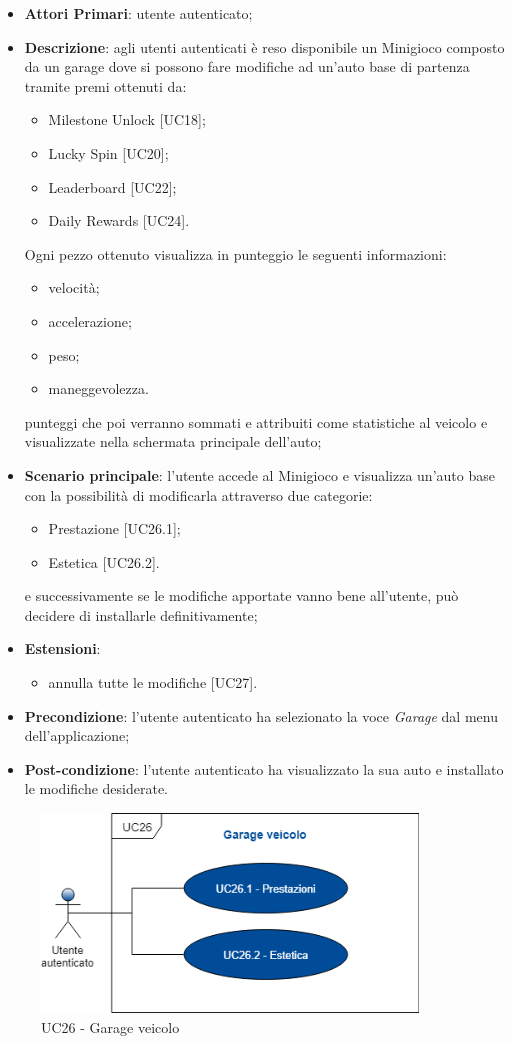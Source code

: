 \begin{itemize}
	\item \textbf{Attori Primari}: utente autenticato;
	\item \textbf{Descrizione}: agli utenti autenticati è reso disponibile un Minigioco composto da un garage dove si possono fare modifiche ad un'auto base di partenza tramite premi ottenuti da:
	\begin{itemize}
		\item Milestone Unlock [UC18];
		\item Lucky Spin [UC20];
		\item Leaderboard [UC22];
		\item Daily Rewards [UC24]. 
	\end{itemize} 
	Ogni pezzo ottenuto visualizza in punteggio le seguenti informazioni:
	\begin{itemize}
		\item velocità;
		\item accelerazione;
		\item peso;
		\item maneggevolezza.
	\end{itemize}
	punteggi che poi verranno sommati e attribuiti come statistiche al veicolo e visualizzate nella schermata principale dell'auto; 
	\item \textbf{Scenario principale}: l'utente accede al Minigioco e visualizza un'auto base con la possibilità di modificarla attraverso due categorie:
	\begin{itemize}
		\item Prestazione [UC26.1];
		\item Estetica [UC26.2].
	\end{itemize}
	e successivamente se le modifiche apportate vanno bene all'utente, può decidere di installarle definitivamente;
	\item \textbf{Estensioni}:
	\begin{itemize}
		\item annulla tutte le modifiche [UC27].
	\end{itemize}
	\item \textbf{Precondizione}: l'utente autenticato ha selezionato la voce \textit{Garage} dal menu dell'applicazione;
	\item \textbf{Post-condizione}: l'utente autenticato ha visualizzato la sua auto e installato le modifiche desiderate. 
\end{itemize}
\begin{figure}[h]
	\includegraphics[width=10cm]{res/images/UC26-Garage.png}
	\centering
	\caption{UC26 - Garage veicolo}
\end{figure}
